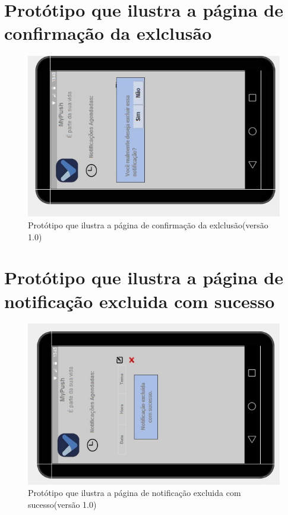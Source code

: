 \begin{apendicesenv}
    \pagebreak
      \section*{Protótipo que ilustra a página de confirmação da exlclusão}

    \begin{figure}[!htbp]
      \centering
      \includegraphics[scale=0.9, angle=-90]{editaveis/figuras/prototipo_alta_fidelidade_v1/1_11}
      \caption{Protótipo que ilustra a página de confirmação da exlclusão(versão 1.0)}
      \label{v1}
    \end{figure}
    
    \pagebreak
      \section*{Protótipo que ilustra a página de notificação excluida com sucesso}

    \begin{figure}[!htbp]
      \centering
      \includegraphics[scale=0.9, angle=-90]{editaveis/figuras/prototipo_alta_fidelidade_v1/1_12}
      \caption{Protótipo que ilustra a página de notificação excluida com sucesso(versão 1.0)}
      \label{v1}
    \end{figure}
    

\end{apendicesenv}
